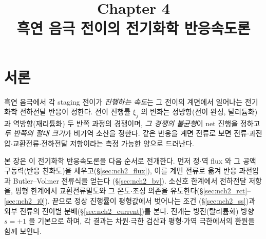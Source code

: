 \documentclass[11pt,a4paper]{article}
\title{\textbf{\LARGE Chapter 4}\\[0.35em]\Large 흑연 음극 전이의 전기화학 반응속도론}
\author{}
\date{}
\begin{document}
\maketitle

\section*{서론}
흑연 음극에서 각 staging 전이가 \emph{진행하는 속도}는 그 전이의 계면에서 일어나는 전기화학 전하전달 반응이
정한다. 전이 진행률 $\xi_j$ 의 변화는 정방향(전이 완성, 탈리튬화)과 역방향(재리튬화) 두 반쪽 과정의 경쟁이며,
\emph{그 경쟁의 불균형}이 net 진행을 정하고 \emph{두 반쪽의 절대 크기}가 비가역 소산을 정한다. 같은 반응을
계면 전류로 보면 전류$\cdot$과전압$\cdot$교환전류$\cdot$전하전달 저항이라는 측정 가능한 양으로 드러난다.

본 장은 이 전기화학 반응속도론을 다음 순서로 전개한다. 먼저 정$\cdot$역 flux 와 그 공액 구동력(반응 친화도)을
세우고(\S\ref{sec:nch2_flux}), 이를 계면 전류로 옮겨 반응 과전압과 Butler--Volmer 전류식을 얻는다
(\S\ref{sec:nch2_bv}). 소신호 한계에서 전하전달 저항을, 평형 한계에서 교환전류밀도와 그 온도$\cdot$조성 의존을
유도한다(\S\ref{sec:nch2_rct}--\ref{sec:nch2_i0}). 끝으로 정상 진행률이 평형값에서 벗어나는 조건
(\S\ref{sec:nch2_ss})과 외부 전류의 전이별 분배(\S\ref{sec:nch2_current})를 본다. 전개는 방전(탈리튬화) 방향
$s=+1$ 을 기본으로 하며, 각 결과는 차원$\cdot$극한 검산과 평형$\cdot$가역 극한에서의 환원을 함께 보인다.

\tableofcontents
\newpage

\end{document}
